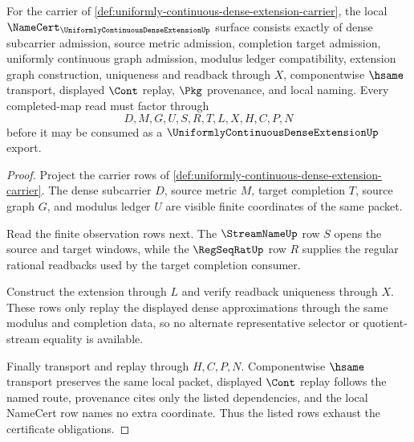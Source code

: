 \begin{theorem}
\label{thm:uniformly-continuous-dense-extension-obligations}
For the carrier of \autoref{def:uniformly-continuous-dense-extension-carrier}, the local $\NameCert_{\UniformlyContinuousDenseExtensionUp}$ surface consists exactly of dense subcarrier admission, source metric admission, completion target admission, uniformly continuous graph admission, modulus ledger compatibility, extension graph construction, uniqueness and readback through $X$, componentwise $\hsame$ transport, displayed $\Cont$ replay, $\Pkg$ provenance, and local naming. Every completed-map read must factor through
$$
D,M,G,U,S,R,T,L,X,H,C,P,N
$$
before it may be consumed as a $\UniformlyContinuousDenseExtensionUp$ export.
\end{theorem}
\begin{proof}
Project the carrier rows of \autoref{def:uniformly-continuous-dense-extension-carrier}. The dense subcarrier $D$, source metric $M$, target completion $T$, source graph $G$, and modulus ledger $U$ are visible finite coordinates of the same packet.

Read the finite observation rows next. The $\StreamNameUp$ row $S$ opens the source and target windows, while the $\RegSeqRatUp$ row $R$ supplies the regular rational readbacks used by the target completion consumer.

Construct the extension through $L$ and verify readback uniqueness through $X$. These rows only replay the displayed dense approximations through the same modulus and completion data, so no alternate representative selector or quotient-stream equality is available.

Finally transport and replay through $H,C,P,N$. Componentwise $\hsame$ transport preserves the same local packet, displayed $\Cont$ replay follows the named route, provenance cites only the listed dependencies, and the local NameCert row names no extra coordinate. Thus the listed rows exhaust the certificate obligations.
\end{proof}



